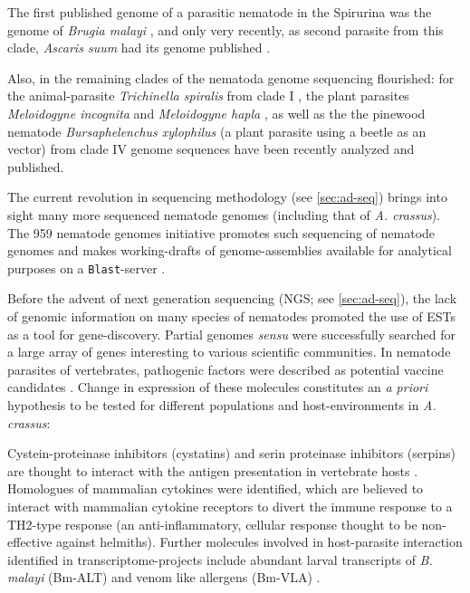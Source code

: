 The first published genome of a parasitic nematode in the Spirurina
was the genome of \textit{Brugia malayi} \cite{ghedin_draft_2007}, and
only very recently, as second parasite from this clade,
\textit{Ascaris suum} had its genome published \cite{pmid22031327}.

Also, in the remaining clades of the nematoda genome sequencing
flourished: for the animal-parasite \textit{Trichinella spiralis} from
clade I \cite{pmid21336279}, the plant parasites \textit{Meloidogyne
  incognita} \cite{pmid18660804} and \textit{Meloidogyne hapla}
\cite{pmid18809916}, as well as the the pinewood nematode
\textit{Bursaphelenchus xylophilus} \cite{pmid21909270} (a plant
parasite using a beetle as an vector) from clade IV genome sequences
have been recently analyzed and published.

The current revolution in sequencing methodology (see
\ref{sec:ad-seq}) brings into sight many more sequenced nematode
genomes (including that of \textit{A. crassus}). The 959 nematode
genomes initiative promotes such sequencing of nematode genomes and
makes working-drafts of genome-assemblies available for analytical
purposes on a \texttt{Blast}-server \cite{pmid22058131}.

Before the advent of next generation sequencing (NGS; see
\ref{sec:ad-seq}), the lack of genomic information on many species of
nematodes promoted the use of ESTs as a tool for
gene-discovery. Partial genomes \textit{sensu}
\cite{parkinson_partigene--constructing_2004} were successfully
searched for a large array of genes interesting to various scientific
communities. In nematode parasites of vertebrates, pathogenic factors
were described as potential vaccine candidates
\cite{pmid11406138}. Change in expression of these molecules
constitutes an \textit{a priori} hypothesis to be tested for different
populations and host-environments in \textit{A. crassus}:

Cystein-proteinase inhibitors (cystatins) and serin proteinase
inhibitors (serpins) are thought to interact with the antigen
presentation in vertebrate hosts \cite{pmid11406138}. Homologues of
mammalian cytokines were identified, which are believed to interact
with mammalian cytokine receptors to divert the immune response to a
TH2-type response \cite{maizels_helminth_2004} (an anti-inflammatory,
cellular response thought to be non-effective against
helmiths). Further molecules involved in host-parasite interaction
identified in transcriptome-projects include abundant larval
transcripts of \textit{B. malayi} (Bm-ALT)
\cite{gomez-escobar_abundant_2002} and venom like allergens (Bm-VLA)
\cite{pmid11704277}.

